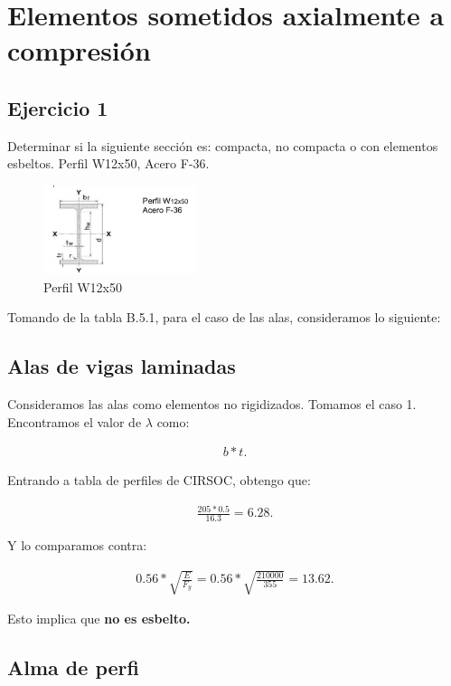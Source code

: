 \documentclass[../main.tex]{subfiles}
\begin{document}
\section{Elementos sometidos axialmente a compresión}
\subsection{Ejercicio 1}

Determinar si la siguiente sección es: compacta, no compacta o con elementos 
esbeltos. Perfil W12x50, Acero F-36. 

\begin{figure}[ht]
  \centering
  \includegraphics[width=0.4\textwidth]{../images/20210419/ej1}
  \caption{Perfil W12x50}
  \label{fig:ej1}
\end{figure}

Tomando de la tabla B.5.1, para el caso de las alas, consideramos lo siguiente:

\subsection{Alas de vigas laminadas}

Consideramos las alas como elementos no rigidizados. Tomamos el caso 1.
Encontramos el valor de $\lambda$ como:

\begin{align*}
  b * t 
.\end{align*}

Entrando a tabla de perfiles de CIRSOC, obtengo que:

\begin{align*}
  \frac{205*0.5}{16.3} = 6.28  
.\end{align*}

Y lo comparamos contra:

\begin{align*}
  0.56 * \sqrt{\frac{E}{F_y}} = 0.56 * \sqrt{\frac{210000}{355}} = 13.62  
.\end{align*}

Esto implica que \textbf{no es esbelto.}

\subsection{Alma de perfi}
\end{document}
